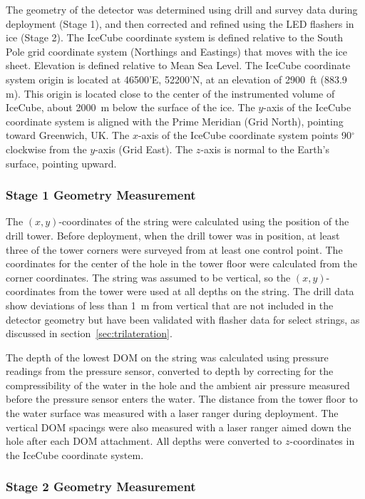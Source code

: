 The geometry of the detector was determined using drill and survey data
during deployment (Stage 1), and then corrected and refined using the LED
flashers in ice (Stage 2). The IceCube coordinate system is
defined relative to the South Pole grid coordinate system (Northings and
Eastings) that moves with the ice sheet.  Elevation is defined relative to
Mean Sea Level.  The IceCube coordinate system origin
is located at 46500'E, 52200'N, at an elevation of 2900~ft (883.9
m).  This origin is located close to the center of the instrumented volume of
IceCube, about 2000~m below the surface of the ice. The $y$-axis of
the IceCube coordinate system is aligned with the Prime Meridian (Grid North),
pointing toward Greenwich, UK. The $x$-axis of the IceCube coordinate
system points 90$^{\circ}$ clockwise from the $y$-axis (Grid East). The $z$-axis is
normal to the Earth's surface, pointing upward. 

\subsubsection{\label{subsec:stage1_geo}Stage 1 Geometry Measurement}
The $(x,y)$-coordinates of the string were calculated using the position of
the drill tower. Before deployment, when the drill tower was in position, at
least three of the tower corners were surveyed from at least one control
point.  The coordinates for the center of the hole in the tower floor were
calculated from the corner coordinates. The string was assumed to be
vertical, so the $(x,y)$-coordinates from the tower were used at all
depths on the string. The drill
data show deviations of less than 1~m from vertical that are not
included in the detector geometry but have been validated
with flasher data for select strings, as discussed in section~\ref{sec:trilateration}. 

The depth of the lowest DOM on the string was calculated using pressure
readings from the pressure sensor, converted to depth by correcting for the
compressibility of the water in the hole and the ambient air pressure
measured before the pressure sensor enters the water. The distance from the
tower floor to the water surface was measured with a laser ranger
during deployment. The
vertical DOM spacings were also measured with a laser
ranger aimed down the hole after each DOM attachment. All depths were
converted to $z$-coordinates in the IceCube 
coordinate system.

\subsubsection{\label{subsec:stage2_geo}Stage 2 Geometry Measurement}

